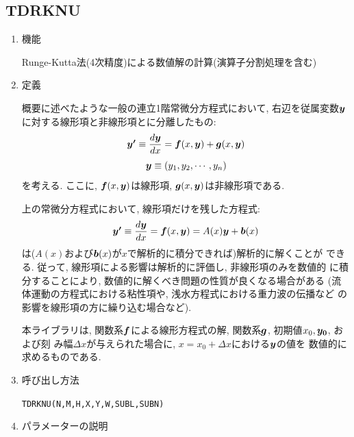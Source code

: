 
\subsection{TDRKNU}

\begin{enumerate}

\item 機能 

Runge-Kutta法(4次精度)による数値解の計算(演算子分割処理を含む)

\item 定義

概要に述べたような一般の連立1階常微分方程式において, 右辺を従属変数$\mbox{\boldmath $y$}$
に対する線形項と非線形項とに分離したもの:
\begin{equation}
\mbox{\boldmath $y'$}\equiv\frac{d\mbox{\boldmath $y$}}{dx}=\mbox{\boldmath $f$} (x,\mbox{\boldmath $y$})+\mbox{\boldmath $g$} (x,\mbox{\boldmath $y$})
\end{equation}
\begin{equation}
\mbox{\boldmath $y$}\equiv (y_1,y_2,\cdots,y_n)
\end{equation}
を考える. ここに, $\mbox{\boldmath $f$} (x,\mbox{\boldmath $y$})$は線形項, $\mbox{\boldmath $g$} (x,\mbox{\boldmath $y$})$は非線形項である.

上の常微分方程式において, 線形項だけを残した方程式:
\begin{equation}
\mbox{\boldmath $y'$}\equiv\frac{d\mbox{\boldmath $y$}}{dx}=\mbox{\boldmath $f$} (x,\mbox{\boldmath $y$})=A(x)\mbox{\boldmath $y$}+\mbox{\boldmath $b$} (x)
\end{equation}
は($A(x)$および$\mbox{\boldmath $b$} (x)$が$x$で解析的に積分できれば)解析的に解くことが
できる. 従って, 線形項による影響は解析的に評価し, 非線形項のみを数値的
に積分することにより, 数値的に解くべき問題の性質が良くなる場合がある
(流体運動の方程式における粘性項や, 浅水方程式における重力波の伝播など
の影響を線形項の方に繰り込む場合など).

本ライブラリは, 
関数系$\mbox{\boldmath $f$}$による線形方程式の解, 関数系$\mbox{\boldmath $g$}$, 初期値$x_0, \mbox{\boldmath $y_0$}$, および刻
み幅$\Delta x$が与えられた場合に, $x=x_0+\Delta x$における$\mbox{\boldmath $y$}$の値を
数値的に求めるものである.

\item 呼び出し方法 
    
{\tt TDRKNU(N,M,H,X,Y,W,SUBL,SUBN)}
  
\item パラメーターの説明 
    

\end{enumerate}
